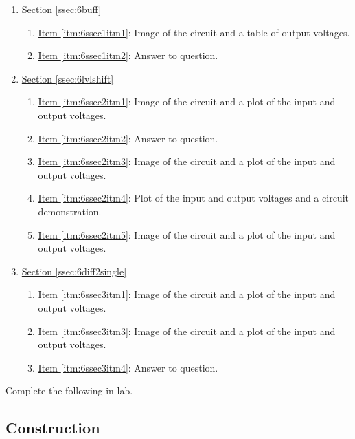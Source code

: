 \begin{enumerate}
	\item \hyperref[ssec:6buff]{Section \ref*{ssec:6buff}}
		\begin{enumerate}
			\item \hyperref[itm:6ssec1itm1]{Item \ref*{itm:6ssec1itm1}}: Image of the circuit and a table of output voltages.
			\item \hyperref[itm:6ssec1itm2]{Item \ref*{itm:6ssec1itm2}}: Answer to question.
		\end{enumerate}
	\item \hyperref[ssec:6lvlshift]{Section \ref*{ssec:6lvlshift}}
		\begin{enumerate}
			\item \hyperref[itm:6ssec2itm1]{Item \ref*{itm:6ssec2itm1}}: Image of the circuit and a plot of the input and output voltages.
			\item \hyperref[itm:6ssec2itm2]{Item \ref*{itm:6ssec2itm2}}: Answer to question.
			\item \hyperref[itm:6ssec2itm3]{Item \ref*{itm:6ssec2itm3}}: Image of the circuit and a plot of the input and output voltages.
			\item \hyperref[itm:6ssec2itm4]{Item \ref*{itm:6ssec2itm4}}: Plot of the input and output voltages and a circuit demonstration.
			\item \hyperref[itm:6ssec2itm4]{Item \ref*{itm:6ssec2itm5}}: Image of the circuit and a plot of the input and output voltages.
		\end{enumerate}
	\item \hyperref[ssec:6diff2single]{Section \ref*{ssec:6diff2single}}
		\begin{enumerate}
			\item \hyperref[itm:6ssec3itm1]{Item \ref*{itm:6ssec3itm1}}: Image of the circuit and a plot of the input and output voltages.
			\item \hyperref[itm:6ssec3itm3]{Item \ref*{itm:6ssec3itm3}}: Image of the circuit and a plot of the input and output voltages.
			\item \hyperref[itm:6ssec3itm4]{Item \ref*{itm:6ssec3itm4}}: Answer to question.
		\end{enumerate}
\end{enumerate}

Complete the following in lab.

\subsection{Construction} \label{ssec:6const}

